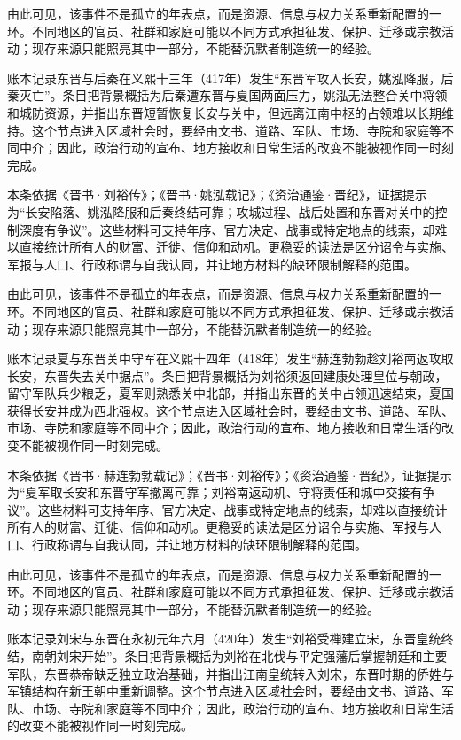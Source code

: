 由此可见，该事件不是孤立的年表点，而是资源、信息与权力关系重新配置的一环。不同地区的官员、社群和家庭可能以不同方式承担征发、保护、迁移或宗教活动；现存来源只能照亮其中一部分，不能替沉默者制造统一的经验。

账本记录东晋与后秦在义熙十三年（417年）发生“东晋军攻入长安，姚泓降服，后秦灭亡”。条目把背景概括为后秦遭东晋与夏国两面压力，姚泓无法整合关中将领和城防资源，并指出东晋短暂恢复长安与关中，但远离江南中枢的占领难以长期维持。这个节点进入区域社会时，要经由文书、道路、军队、市场、寺院和家庭等不同中介；因此，政治行动的宣布、地方接收和日常生活的改变不能被视作同一时刻完成。

本条依据《晋书·刘裕传》；《晋书·姚泓载记》；《资治通鉴·晋纪》，证据提示为“长安陷落、姚泓降服和后秦终结可靠；攻城过程、战后处置和东晋对关中的控制深度有争议”。这些材料可支持年序、官方决定、战事或特定地点的线索，却难以直接统计所有人的财富、迁徙、信仰和动机。更稳妥的读法是区分诏令与实施、军报与人口、行政称谓与自我认同，并让地方材料的缺环限制解释的范围。

由此可见，该事件不是孤立的年表点，而是资源、信息与权力关系重新配置的一环。不同地区的官员、社群和家庭可能以不同方式承担征发、保护、迁移或宗教活动；现存来源只能照亮其中一部分，不能替沉默者制造统一的经验。

账本记录夏与东晋关中守军在义熙十四年（418年）发生“赫连勃勃趁刘裕南返攻取长安，东晋失去关中据点”。条目把背景概括为刘裕须返回建康处理皇位与朝政，留守军队兵少粮乏，夏军则熟悉关中北部，并指出东晋的关中占领迅速结束，夏国获得长安并成为西北强权。这个节点进入区域社会时，要经由文书、道路、军队、市场、寺院和家庭等不同中介；因此，政治行动的宣布、地方接收和日常生活的改变不能被视作同一时刻完成。

本条依据《晋书·赫连勃勃载记》；《晋书·刘裕传》；《资治通鉴·晋纪》，证据提示为“夏军取长安和东晋守军撤离可靠；刘裕南返动机、守将责任和城中交接有争议”。这些材料可支持年序、官方决定、战事或特定地点的线索，却难以直接统计所有人的财富、迁徙、信仰和动机。更稳妥的读法是区分诏令与实施、军报与人口、行政称谓与自我认同，并让地方材料的缺环限制解释的范围。

由此可见，该事件不是孤立的年表点，而是资源、信息与权力关系重新配置的一环。不同地区的官员、社群和家庭可能以不同方式承担征发、保护、迁移或宗教活动；现存来源只能照亮其中一部分，不能替沉默者制造统一的经验。

账本记录刘宋与东晋在永初元年六月（420年）发生“刘裕受禅建立宋，东晋皇统终结，南朝刘宋开始”。条目把背景概括为刘裕在北伐与平定强藩后掌握朝廷和主要军队，东晋恭帝缺乏独立政治基础，并指出江南皇统转入刘宋，东晋时期的侨姓与军镇结构在新王朝中重新调整。这个节点进入区域社会时，要经由文书、道路、军队、市场、寺院和家庭等不同中介；因此，政治行动的宣布、地方接收和日常生活的改变不能被视作同一时刻完成。

